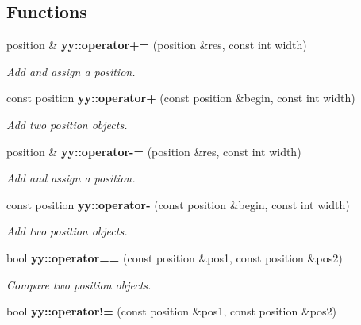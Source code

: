 \subsection*{Functions}
\begin{DoxyCompactItemize}
\item 
\hypertarget{namespaceyy_a62bb14e85b964dd6afab7fca21053e43}{position \& {\bfseries yy\-::operator+=} (position \&res, const int width)}\label{namespaceyy_a62bb14e85b964dd6afab7fca21053e43}

\begin{DoxyCompactList}\small\item\em Add and assign a position. \end{DoxyCompactList}\item 
\hypertarget{namespaceyy_a26f5ab7d06a8b08b7fb9171e90ad87d7}{const position {\bfseries yy\-::operator+} (const position \&begin, const int width)}\label{namespaceyy_a26f5ab7d06a8b08b7fb9171e90ad87d7}

\begin{DoxyCompactList}\small\item\em Add two position objects. \end{DoxyCompactList}\item 
\hypertarget{namespaceyy_adda963ed0c07b38ea639f4d1eca94882}{position \& {\bfseries yy\-::operator-\/=} (position \&res, const int width)}\label{namespaceyy_adda963ed0c07b38ea639f4d1eca94882}

\begin{DoxyCompactList}\small\item\em Add and assign a position. \end{DoxyCompactList}\item 
\hypertarget{namespaceyy_a870347901bc2465a095864610c9d04b1}{const position {\bfseries yy\-::operator-\/} (const position \&begin, const int width)}\label{namespaceyy_a870347901bc2465a095864610c9d04b1}

\begin{DoxyCompactList}\small\item\em Add two position objects. \end{DoxyCompactList}\item 
\hypertarget{namespaceyy_a30a61b0569cd2c9ea4ae16eb4994c7b3}{bool {\bfseries yy\-::operator==} (const position \&pos1, const position \&pos2)}\label{namespaceyy_a30a61b0569cd2c9ea4ae16eb4994c7b3}

\begin{DoxyCompactList}\small\item\em Compare two position objects. \end{DoxyCompactList}\item 
\hypertarget{namespaceyy_abf91f5a379cf9f8c8be94f650c48c06c}{bool {\bfseries yy\-::operator!=} (const position \&pos1, const position \&pos2)}\label{namespaceyy_abf91f5a379cf9f8c8be94f650c48c06c}


\end{DoxyCompactItemize}
